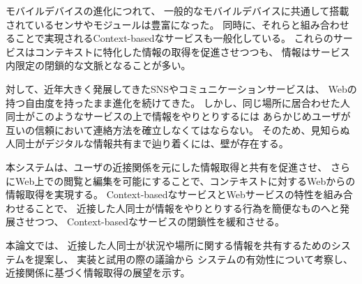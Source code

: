 


\begin{jabstract}

モバイルデバイスの進化につれて、
一般的なモバイルデバイスに共通して搭載されているセンサやモジュールは豊富になった。
同時に、それらと組み合わせることで実現されるContext-basedなサービスも一般化している。
これらのサービスはコンテキストに特化した情報の取得を促進させつつも、
情報はサービス内限定の閉鎖的な文脈となることが多い。

対して、近年大きく発展してきたSNSやコミュニケーションサービスは、
Webの持つ自由度を持ったまま進化を続けてきた。
しかし、同じ場所に居合わせた人同士がこのようなサービスの上で情報をやりとりするには
あらかじめユーザが互いの信頼において連絡方法を確立しなくてはならない。
そのため、見知らぬ人同士がデジタルな情報共有まで辿り着くには、壁が存在する。

本システムは、ユーザの近接関係を元にした情報取得と共有を促進させ、
さらにWeb上での閲覧と編集を可能にすることで、コンテキストに対するWebからの情報取得を実現する。
Context-basedなサービスとWebサービスの特性を組み合わせることで、
近接した人同士が情報をやりとりする行為を簡便なものへと発展させつつ、
Context-basedなサービスの閉鎖性を緩和させる。

本論文では、
近接した人同士が状況や場所に関する情報を共有するためのシステムを提案し、
実装と試用の際の議論から
システムの有効性について考察し、
近接関係に基づく情報取得の展望を示す。

\end{jabstract}



